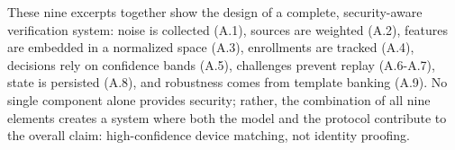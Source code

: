\noindent These nine excerpts together show the design of a complete, security-aware verification system: noise is collected (A.1), sources are weighted (A.2), features are embedded in a normalized space (A.3), enrollments are tracked (A.4), decisions rely on confidence bands (A.5), challenges prevent replay (A.6-A.7), state is persisted (A.8), and robustness comes from template banking (A.9). No single component alone provides security; rather, the combination of all nine elements creates a system where both the model and the protocol contribute to the overall claim: high-confidence device matching, not identity proofing.

